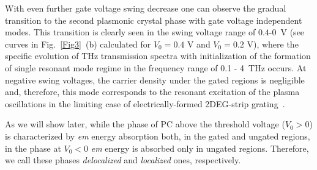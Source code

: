 \documentclass[%
 reprint,
 amsmath,amssymb,
 aps,
]{revtex4-2}
\def\red{\textcolor{red}}
\begin{document}
With even further gate voltage swing decrease one can observe the gradual transition to the second plasmonic crystal phase with gate voltage independent modes.  
This transition is clearly seen in the swing voltage range of $0.4$-$0$~V (see curves in Fig.~\ref{Fig3}~(b) calculated for $V_{0}=0.4$ V and $V_{0}=0.2$ V), where the specific evolution of THz transmission spectra with initialization of the formation of single resonant mode regime in the frequency range of 0.1 - 4~THz occurs.
At negative swing voltages, the carrier density under the gated regions is negligible and, therefore, this mode corresponds to the resonant excitation of the plasma oscillations in the limiting case of electrically-formed 2DEG-strip grating~\cite{Michailov1998, Schaich2000, Nosich2017}.


As we will show later, while the phase of PC above the threshold voltage ($V_0>0$) is characterized by \textit{em} energy absorption both, in the gated and ungated regions, in the phase at $V_0<0$ \textit{em} energy is absorbed only in ungated regions. Therefore, we call these phases \textit{delocalized} and \textit{localized} ones, respectively. 
\end{document}
